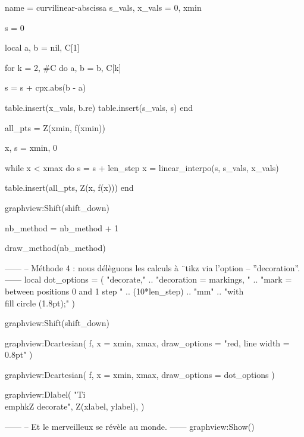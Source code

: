 \documentclass{standalone}
\begin{document}
\begin{luadraw}{name = curvilinear-abscissa}
s_vals, x_vals = {0}, {xmin}

s = 0

local a, b = nil, C[1]

for k = 2, #C do
  a, b = b, C[k]

  s = s + cpx.abs(b - a)

  table.insert(x_vals, b.re)
  table.insert(s_vals, s)
end

all_pts = {Z(xmin, f(xmin))}

x, s = xmin, 0

while x < xmax do
  s = s + len_step
  x = linear_interpo(s, s_vals, x_vals)

  table.insert(all_pts, Z(x, f(x)))
end

graphview:Shift(shift_down)

nb_method = nb_method + 1

draw_method(nb_method)

------
-- Méthode 4 : nous délèguons les calculs à ¨tikz via l'option
-- ''decoration''.
------
local dot_options = (
     "decorate,"
  .. "decoration = {markings, "
  .. "mark = between positions 0 and 1 step "
  .. (10*len_step) .. "mm"
  .. "with {\\fill circle (1.8pt);}}"
)

graphview:Shift(shift_down)

graphview:Dcartesian(
  f,
  {
    x = {xmin, xmax},
    draw_options = "red, line width = 0.8pt"
  }
)

graphview:Dcartesian(
  f,
  {
    x = {xmin, xmax},
    draw_options = dot_options
  }
)

graphview:Dlabel(
  "Ti\\emph{k}Z decorate", Z(xlabel, ylabel), {}
)

------
-- Et le merveilleux se révèle au monde.
------
graphview:Show()
\end{luadraw}
\end{document}
